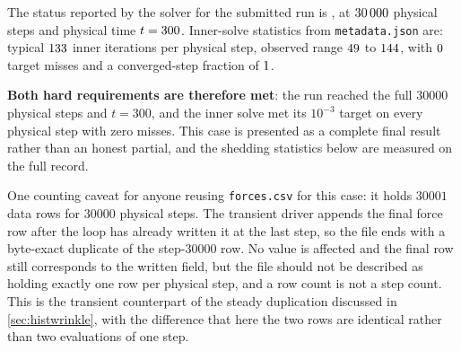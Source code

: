 The status reported by the solver for the submitted run is
\cnsStatusCylShed, at $\num{30000}$ physical steps and physical time
$t=\num{300}$. Inner-solve statistics from \texttt{metadata.json} are:
typical $\num{133}$ inner iterations per physical step,
observed range $\num{49}$ to
$\num{144}$, with
$\num{0}$ target misses and a converged-step fraction of
$\num{1}$.

\textbf{Both hard requirements are therefore met}: the run reached the full
$\num{30000}$ physical steps and $t=300$, and the inner solve met its $10^{-3}$ target
on every physical step with zero misses. This case is presented as a complete final
result rather than an honest partial, and the shedding statistics below are measured on
the full record.

One counting caveat for anyone reusing \texttt{forces.csv} for this case: it holds
$\num{30001}$ data rows for $\num{30000}$ physical steps. The transient driver appends the
final force row after the loop has already written it at the last step, so the file ends
with a byte-exact duplicate of the step-$\num{30000}$ row. No value is affected and the
final row still corresponds to the written field, but the file should not be described as
holding exactly one row per physical step, and a row count is not a step count. This is the
transient counterpart of the steady duplication discussed in \cref{sec:histwrinkle}, with
the difference that here the two rows are identical rather than two evaluations of one step.

